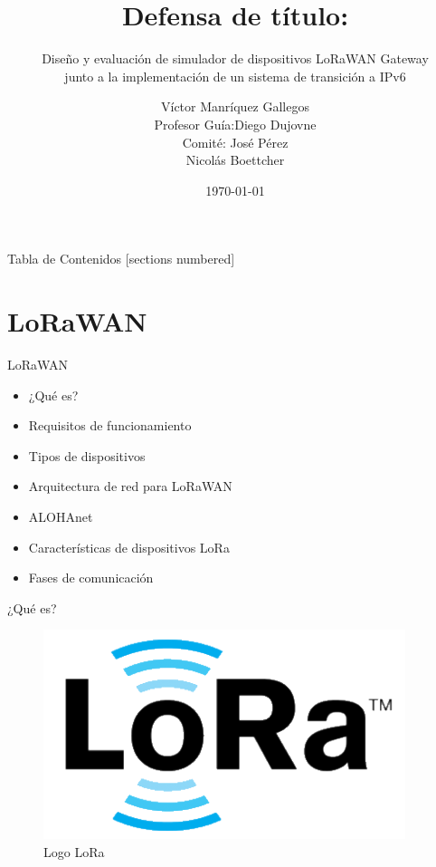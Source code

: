 \documentclass[10pt]{beamer}
\title{Defensa de título:}
\subtitle{\normalsize Diseño y evaluación de simulador de dispositivos LoRaWAN Gateway\\junto a la implementación de un sistema de transición a IPv6}
\date{\today}
\author{Víctor Manríquez	 Gallegos\\
\newline
\scriptsize
Profesor Guía:Diego Dujovne\\
Comité: José Pérez\\
\phantom{x}\hspace{7.5ex}Nicolás Boettcher }
\institute{Universidad Diego Portales}
\begin{document}
\maketitle

\begin{frame}{Tabla de Contenidos}
  [sections numbered]
  \tableofcontents[hideallsubsections]
\end{frame}

\section{LoRaWAN}

\begin{frame}[fragile]{LoRaWAN}
\begin{itemize}
\item ¿Qué es?
\item Requisitos de funcionamiento
\item Tipos de dispositivos
\item Arquitectura de red para LoRaWAN
\item ALOHAnet
\item Características de dispositivos LoRa
\item Fases de comunicación
\end{itemize}
\end{frame}

\begin{frame}[fragile]{¿Qué es?}
\begin{figure}
\begin{overprint}
\hspace{2cm}\centering\includegraphics[scale=0.8]{imagenes/loralogo}\caption{Logo LoRa}
\end{overprint}
\end{figure}
\end{frame}
\end{document}
